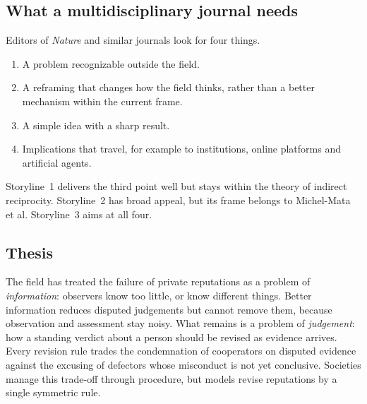 \documentclass[11pt]{article}
\begin{document}
\subsection*{What a multidisciplinary journal needs}
Editors of \textit{Nature} and similar journals look for four things.
\begin{enumerate}[leftmargin=1.5em]
\item A problem recognizable outside the field.
\item A reframing that changes how the field thinks, rather than a better mechanism within the current frame.
\item A simple idea with a sharp result.
\item Implications that travel, for example to institutions, online platforms and artificial agents.
\end{enumerate}
Storyline~1 delivers the third point well but stays within the theory of indirect reciprocity. Storyline~2 has broad appeal, but its frame belongs to Michel-Mata et al. Storyline~3 aims at all four.

\subsection*{Thesis}
The field has treated the failure of private reputations as a problem of \emph{information}: observers know too little, or know different things. Better information reduces disputed judgements but cannot remove them, because observation and assessment stay noisy. What remains is a problem of \emph{judgement}: how a standing verdict about a person should be revised as evidence arrives. Every revision rule trades the condemnation of cooperators on disputed evidence against the excusing of defectors whose misconduct is not yet conclusive. Societies manage this trade-off through procedure, but models revise reputations by a single symmetric rule.
\end{document}
